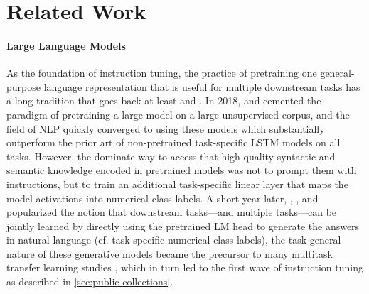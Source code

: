 \section{Related Work}
\label{sec:rw}

\paragraph{Large Language Models} %
As the foundation of instruction tuning, the practice of pretraining one general-purpose language representation that is useful for multiple downstream tasks has a long tradition that goes back at least \citet{word2vec} and \citet{pretrainedLSTM}. %
In 2018, \citet{peters-etal-2018-deep} and \citet{devlin-etal-2019-bert} cemented the paradigm of pretraining a large model on a large unsupervised corpus, and the field of NLP quickly converged to using these models which substantially outperform the prior art of non-pretrained task-specific LSTM models on all tasks. 
However, the dominate way to access that high-quality syntactic and semantic knowledge encoded in pretrained models was not to prompt them with instructions,
but to train an additional task-specific linear layer that maps the model activations into numerical class labels.
A short year later, \citet{radford2019language}, \citet{raffel2020exploring}, and \citet{lewis-etal-2020-bart} popularized the notion that downstream tasks—and multiple tasks—can be jointly learned by directly using the pretrained LM head to generate the answers in natural language (cf. task-specific numerical class labels), %
the task-general nature of these generative models became the precursor to many multitask transfer learning studies \citep{mccann2018natural,khashabi-etal-2020-unifiedqa,ye2021crossfit,vu-etal-2020-exploring}, which in turn led to the first wave of instruction tuning as described in \cref{sec:public-collections}.

